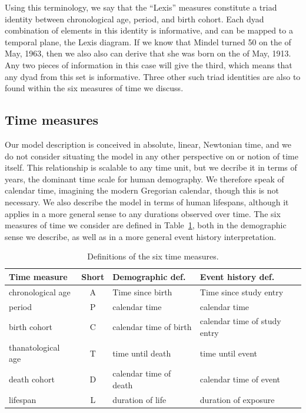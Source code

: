 \documentclass[12pt,oneside,letter]{article} %
\begin{document}
Using this terminology, we say that the ``Lexis'' measures
constitute a triad identity between chronological age, period, and birth cohort. Each dyad
combination of elements in this identity is informative, and can be mapped to a
temporal plane, the Lexis diagram. If we know that Mindel turned 50 on the
 of May, 1963, then we also also can derive that she was born on the  of
May, 1913. Any two pieces of information in this case will give the third, which
means that any dyad from this set is informative. Three other such triad
identities are also to found within the six measures of time we discuss.
\FloatBarrier

\subsection*{Time measures}
\FloatBarrier
Our model description is conceived in absolute, linear, Newtonian time, and we
do not consider situating the model in any other perspective on or notion of
time itself.
This relationship is scalable to any time unit, but we decribe it in terms of
years, the dominant time scale for human demography. We therefore speak of
calendar time, imagining the modern Gregorian calendar, though this is not
necessary. We also describe the model in terms of human lifespans, although it
applies in a more general sense to any durations observed over time.
The six measures of time we consider are defined in Table~\ref{tab:sixdefs}, both in the demographic sense we describe, as well as in a more general event history interpretation.


\begin{table}
\centering
\caption{Definitions of the six time measures.}
\label{tab:sixdefs}
\begin{adjustwidth}{-2em}{-2em}
\begin{tabular}{lcll}
\hline 
\textbf{Time measure} & \textbf{Short} & \textbf{Demographic def.} &
\textbf{Event history def.}\\
\hline 
chronological age & A & Time since birth & Time since study entry \\
period & P & calendar time & calendar time \\
birth cohort & C & calendar time of birth & calendar time of study entry \\
thanatological age & T & time until death & time until event \\
death cohort & D & calendar time of death & calendar time of event \\
lifespan & L & duration of life & duration of exposure \\
\end{tabular}
\end{adjustwidth}
\end{table}
\end{document}
